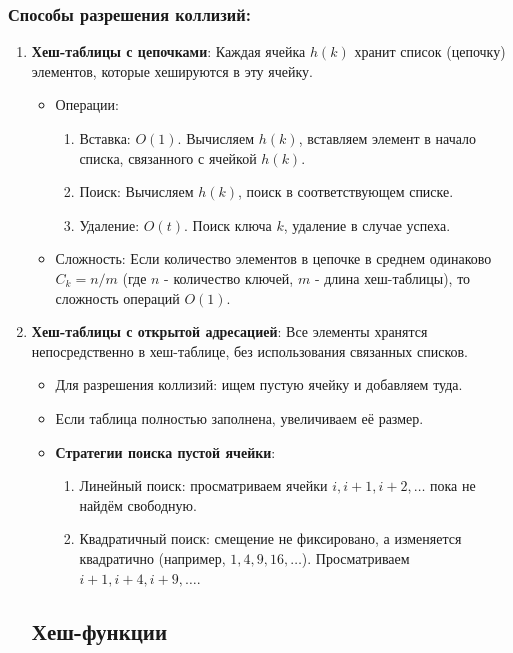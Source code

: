 \subsubsection*{Способы разрешения коллизий:}
\begin{enumerate}
	\item \textbf{Хеш-таблицы с цепочками}:
	Каждая ячейка $h(k)$ хранит список (цепочку) элементов, которые хешируются в эту ячейку.
	\begin{itemize}
		\item Операции:
		\begin{enumerate}
			\item Вставка: $O(1)$. Вычисляем $h(k)$, вставляем элемент в начало списка, связанного с ячейкой $h(k)$.
			\item Поиск: Вычисляем $h(k)$, поиск в соответствующем списке.
			\item Удаление: $O(t)$. Поиск ключа $k$, удаление в случае успеха.
		\end{enumerate}
		\item Сложность: Если количество элементов в цепочке в среднем одинаково $C_k = n/m$ (где $n$ - количество ключей, $m$ - длина хеш-таблицы), то сложность операций $O(1)$.
	\end{itemize}
	
	\item \textbf{Хеш-таблицы с открытой адресацией}:
	Все элементы хранятся непосредственно в хеш-таблице, без использования связанных списков.
	\begin{itemize}
		\item Для разрешения коллизий: ищем пустую ячейку и добавляем туда.
		\item Если таблица полностью заполнена, увеличиваем её размер.
		\item \textbf{Стратегии поиска пустой ячейки}:
		\begin{enumerate}
			\item Линейный поиск: просматриваем ячейки $i, i+1, i+2, \dots$ пока не найдём свободную.
			\item Квадратичный поиск: смещение не фиксировано, а изменяется квадратично (например, $1, 4, 9, 16, \dots$). Просматриваем $i+1, i+4, i+9, \dots$.
		\end{enumerate}
	\end{itemize}
	
	\subsection*{Хеш-функции}

\end{enumerate}

